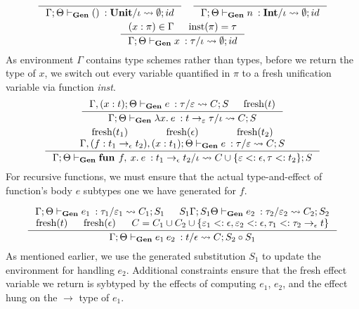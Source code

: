 \documentclass[declaration,shortabstract]{iithesis}
\theoremstyle{definition} \newtheorem{definition}{Definition}[section]
\newcommand{\gens}[6][\Gamma;\Theta]{\ensuremath{{{#1} \vdash_\textbf{Gen} {#2} \: : {#3}/{#4}} \rightsquigarrow {#5};{#6}}}
\newcommand{\arrow}[3]{{#1}\rightarrow_{#2}{#3}}
\newcommand{\lam}[1][x]{\ensuremath{\lambda #1.\:}}
\newcommand{\fun}[1][f,\:x]{\ensuremath{\textbf{fun } #1.\:}}
\newcommand{\fresh}[1]{\ensuremath{\operatorname{fresh}({#1})}}
\begin{document}
\begin{gather*}
    \inference {}{\gens{()}{\textbf{Unit}}{\iota}{\emptyset}{id}}
    \quad
    \inference {}{\gens{n}{\textbf{Int}}{\iota}{\emptyset}{id}} {}
\\
    \inference {
        (x : \pi) \in \Gamma & \operatorname{inst}(\pi) = \tau
    }{
        \gens{x}{\tau}{\iota}{\emptyset}{id}
    }
\end{gather*}
As environment $\Gamma$ contains type schemes rather than types, before we return the type of $x$,
we switch out every variable quantified in $\pi$ to a fresh unification variable
via function \textit{inst}.
\begin{gather*}
     \inference{
        \gens[\Gamma, (x : t); \Theta]{e}{\tau}{\varepsilon}{C}{S} &
        \fresh{t}
    }{
        \gens{\lam e}{\arrow{t}{\varepsilon}{\tau}}{\iota}{C}{S}
    }
\\
    \inference{
        \fresh{t_1} &
        \fresh{\epsilon} &
        \fresh{t_2} \\
        \gens[\Gamma, (f : \arrow{t_1}{\epsilon}{t_2}),(x : t_1); \Theta]{e}{\tau}{\varepsilon}{C}{S}
    }{
        \gens{\fun e}{\arrow{t_1}{\epsilon}{t_2}}{\iota}
        {C \cup \{\varepsilon <: \epsilon, \tau <: t_2 \}}{S}
    }
\end{gather*}
For recursive functions, we must ensure that the actual type-and-effect of function's body $e$
subtypes one we have generated for $f$.

\begin{gather*}
\inference{
    \gens{e_1}{\tau_1}{\varepsilon_1}{C_1}{S_1} &
    \gens[S_1\Gamma;S_1\Theta]{e_2}{\tau_2}{\varepsilon_2}{C_2}{S_2} \\
    \fresh{t} &
    \fresh{\epsilon} &
    C = C_1 \cup C_2 \cup \{\varepsilon_1 <: \epsilon ,
    \varepsilon_2 <: \epsilon, \tau_1 <: \arrow{\tau_2}{\epsilon}{t} \}
}{
    \gens{e_1\:e_2}{t}{\epsilon}{C
    }{S_2 \circ S_1}
}
\end{gather*}
As mentioned earlier, we use the generated substitution $S_1$ to update the
environment for handling $e_2$.
Additional constraints ensure that the fresh effect variable we return is sybtyped by 
the effects of computing $e_1$, $e_2$, and the effect hung on the $\rightarrow$ type of $e_1$.
\end{document}
